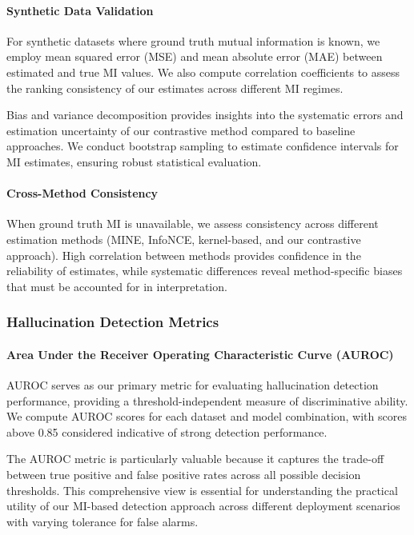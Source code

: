 \paragraph{Synthetic Data Validation}
For synthetic datasets where ground truth mutual information is known, we employ mean squared error (MSE) and mean absolute error (MAE) between estimated and true MI values. We also compute correlation coefficients to assess the ranking consistency of our estimates across different MI regimes.

Bias and variance decomposition provides insights into the systematic errors and estimation uncertainty of our contrastive method compared to baseline approaches. We conduct bootstrap sampling to estimate confidence intervals for MI estimates, ensuring robust statistical evaluation.

\paragraph{Cross-Method Consistency}
When ground truth MI is unavailable, we assess consistency across different estimation methods (MINE, InfoNCE, kernel-based, and our contrastive approach). High correlation between methods provides confidence in the reliability of estimates, while systematic differences reveal method-specific biases that must be accounted for in interpretation.

\subsubsection{Hallucination Detection Metrics}

\paragraph{Area Under the Receiver Operating Characteristic Curve (AUROC)}
AUROC serves as our primary metric for evaluating hallucination detection performance, providing a threshold-independent measure of discriminative ability. We compute AUROC scores for each dataset and model combination, with scores above 0.85 considered indicative of strong detection performance.

The AUROC metric is particularly valuable because it captures the trade-off between true positive and false positive rates across all possible decision thresholds. This comprehensive view is essential for understanding the practical utility of our MI-based detection approach across different deployment scenarios with varying tolerance for false alarms.

